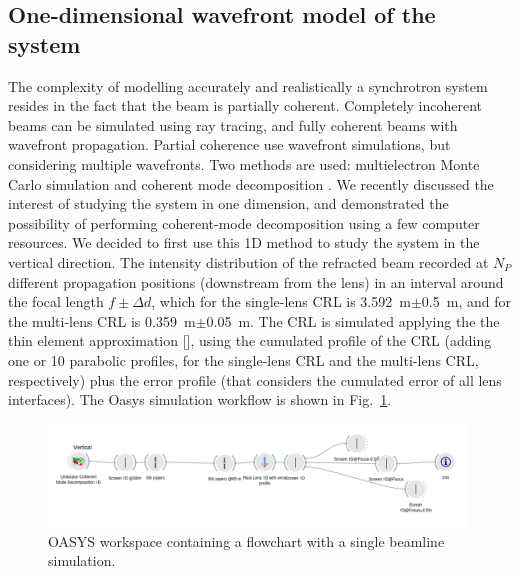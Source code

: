 \documentclass{iucr}
\newcommand{\todo}[1]{{\color{red}[TODO: "#1'']}}
\begin{document}
\subsection{One-dimensional wavefront model of the system}\label{sec:descriptionsystem}
The complexity of modelling accurately and realistically a synchrotron system resides in the fact that the beam is partially coherent. Completely incoherent beams can be simulated using ray tracing, and fully coherent beams with wavefront propagation. Partial coherence use wavefront simulations, but considering multiple wavefronts. Two methods are used: multielectron Monte Carlo simulation \cite{codeSRW_ME} and coherent mode decomposition \cite{Glass2017}. We recently discussed the interest of studying the system in one dimension, and demonstrated the possibility of performing coherent-mode decomposition \cite{multioptics}  using a few computer resources. We decided to first use this 1D method to study the system in the vertical direction. 
The intensity distribution of the refracted beam recorded at $N_P$ different propagation positions (downstream from the lens) in an interval around the focal length $f\pm\Delta d$, which for the single-lens CRL is \SI{3.592}{\meter}$\pm$\SI{0.5}{\meter}, and for the multi-lens CRL is \SI{0.359}{\meter}$\pm$\SI{0.05}{\meter}.
The CRL is simulated applying the the thin element approximation [\cite{SanchezdelRio:ay5600, Celestre:yi5119}], using the cumulated profile of the CRL (adding one or 10 parabolic profiles, for the single-lens CRL and the multi-lens CRL, respectively) plus the error profile (that considers the cumulated error of all lens interfaces).
The Oasys \cite{codeOASYS} simulation workflow is shown in Fig.~\ref{fig:oasys}. 

\begin{figure}\label{fig:oasys}
    \includegraphics[width=0.99\textwidth]{figures/oasys.png}
    \caption{OASYS workspace containing a flowchart with a single beamline simulation. 
    }
\end{figure}
\end{document}
